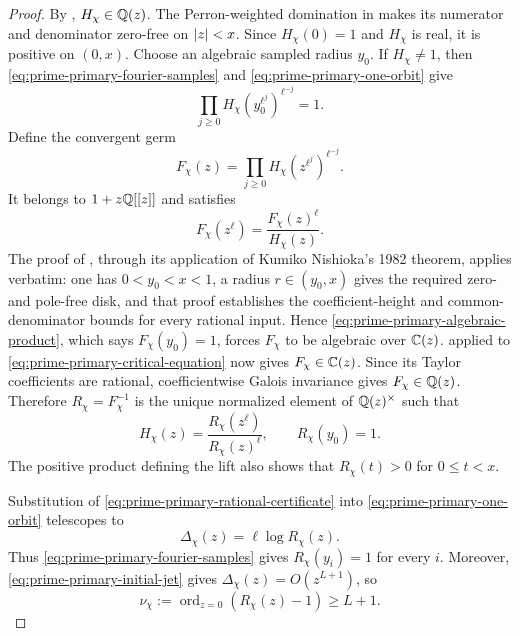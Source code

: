\begin{proof}
By , \(H_\chi\in\mathbb{Q}(z)\).  The
Perron-weighted domination in  makes its
numerator and denominator zero-free on \(\lvert z \rvert<x\).  Since
\(H_\chi(0)=1\) and \(H_\chi\) is real, it is positive on \((0,x)\).
Choose an algebraic sampled radius \(y_0\).  If \(H_\chi\ne1\), then
\eqref{eq:prime-primary-fourier-samples} and
\eqref{eq:prime-primary-one-orbit} give
\begin{equation}\label{eq:prime-primary-algebraic-product}
 \prod_{j\ge0}H_\chi(y_0^{\ell^j})^{\ell^{-j}}=1.
\end{equation}
Define the convergent germ
\[
 F_\chi(z)=\prod_{j\ge0}H_\chi(z^{\ell^j})^{\ell^{-j}}.
\]
It belongs to \(1+z\mathbb{Q}[[z]]\) and satisfies
\begin{equation}\label{eq:prime-primary-critical-equation}
 F_\chi(z^\ell)=\frac{F_\chi(z)^\ell}{H_\chi(z)}.
\end{equation}
The proof of , through its
application of Kumiko Nishioka's 1982 theorem, applies verbatim: one has
\(0<y_0<x<1\), a radius \(r\in(y_0,x)\) gives the required zero- and
pole-free disk, and that proof establishes the coefficient-height and
common-denominator bounds for every rational input.  Hence
\eqref{eq:prime-primary-algebraic-product}, which says \(F_\chi(y_0)=1\),
forces \(F_\chi\) to be algebraic over \(\mathbb{C}(z)\).
 applied to
\eqref{eq:prime-primary-critical-equation} now gives
\(F_\chi\in\mathbb{C}(z)\).  Since its Taylor coefficients are rational,
coefficientwise Galois invariance gives \(F_\chi\in\mathbb{Q}(z)\).  Therefore
\(R_\chi=F_\chi^{-1}\) is the unique normalized element of
\(\mathbb{Q}(z)^\times\) such that
\begin{equation}\label{eq:prime-primary-rational-certificate}
 H_\chi(z)=\frac{R_\chi(z^\ell)}{R_\chi(z)^\ell},
 \qquad R_\chi(y_0)=1.
\end{equation}
The positive product defining the lift also shows that
\(R_\chi(t)>0\) for \(0\le t<x\).

Substitution of \eqref{eq:prime-primary-rational-certificate} into
\eqref{eq:prime-primary-one-orbit} telescopes to
\begin{equation}\label{eq:prime-primary-rational-telescope}
 \Delta_\chi(z)=\ell\log R_\chi(z).
\end{equation}
Thus \eqref{eq:prime-primary-fourier-samples} gives
\(R_\chi(y_i)=1\) for every \(i\).  Moreover,
\eqref{eq:prime-primary-initial-jet} gives
\(\Delta_\chi(z)=O(z^{L+1})\), so
\begin{equation}\label{eq:prime-primary-certificate-jet}
 \nu_\chi:=\operatorname{ord}_{z=0}(R_\chi(z)-1)\ge L+1.
\end{equation}


\end{proof}
